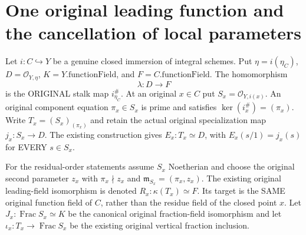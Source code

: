 \section{One original leading function and the cancellation of local parameters}

Let $i:C\hookrightarrow Y$ be a genuine closed immersion of integral schemes.
Put $\eta=i(\eta_C)$, $D=\mathcal O_{Y,\eta}$, $K=Y.\mathrm{functionField}$,
and $F=C.\mathrm{functionField}$. The homomorphism
\[
 \lambda:D\longrightarrow F
\]
is the ORIGINAL stalk map $i^\#_{\eta_C}$. At an original $x\in C$ put
$S_x=\mathcal O_{Y,i(x)}$. An original component equation $\pi_x\in S_x$
is prime and satisfies $\ker(i_x^\#)=(\pi_x)$. Write $T_x=(S_x)_{(\pi_x)}$
and retain the actual original specialization map $j_x:S_x\to D$.
The existing construction gives $E_x:T_x\simeq D$, with
$E_x(s/1)=j_x(s)$ for EVERY $s\in S_x$.

For the residual-order statements assume $S_x$ Noetherian and choose the
original second parameter $z_x$ with $\pi_x\nmid z_x$ and
$\mathfrak m_{S_x}=(\pi_x,z_x)$. The existing original leading-field
isomorphism is denoted
$R_x:\kappa(T_x)\simeq F$. Its target is the SAME original function
field of $C$, rather than the residue field of the closed point $x$.
Let $J_x:\operatorname{Frac}S_x\simeq K$ be the canonical original
fraction-field isomorphism and let $\iota_x:T_x\to\operatorname{Frac}S_x$
be the existing original vertical fraction inclusion.

